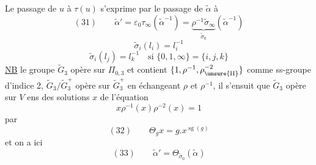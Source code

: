 Le passage de $u$ à $\tau(u)$ s'exprime par
le passage de $\widetilde\alpha$ à
\[
(31)\qquad\widetilde\alpha'=\varepsilon_0\tau_\infty(\widetilde\alpha^{-1})
=\underbrace{\rho^{-1}\widetilde\sigma_\infty}_{\widetilde\sigma_0}(\widetilde\alpha^{-1})
\]
\[
\widetilde\sigma_i(l_i)=l_i^{-1}
\]
\[
\widetilde\sigma_i(l_j)=l_k^{-1}\quad\text{si }\{0,1,\infty\}=\{i,j,k\}
\]
\uline{NB} le groupe $\widetilde G_3$ opère sur $\Pi_{0,3}$ et contient \deleted{$\unsure{\xi}$}  $\{1,\rho^{-1},\rho_{\unsure{\mathrm{II}}}^{-2}\}$ comme ss-groupe  d'indice 2,  $\widetilde G_3/\widetilde G_3^+$ opère sur $\widetilde G_3^+$ en échangeant $\rho$ et $\rho^{-1}$, il s'ensuit que $\widetilde G_3$ opère sur $V$ ens des solutions $x$ de l'équation
\[
x\rho^{-1}(x)\rho^{-2}(x)=1
\]
par
\[
(32)\qquad\Theta_g x=g.x^{\operatorname{sg}(g)}
\]
et on a ici
\[
(33)\qquad\widetilde\alpha'=\Theta_{\widetilde\sigma_0}(\widetilde\alpha)
\]

